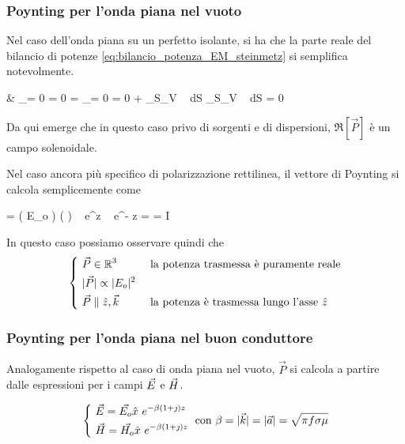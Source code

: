 	
	\subsubsection{Poynting per l'onda piana nel vuoto}
	
		Nel caso dell'onda piana su un perfetto isolante, si ha che la parte reale del bilancio di potenze \ref{eq:bilancio_potenza_EM_steinmetz} si semplifica notevolmente.
		
		\begin{esp} \label{eq:bilancio_potenza_EM_steinmetz}
			& _{= 0  \jt = 0}
				= _{= 0  \sigma = 0}
				+ \int_{S_V} \Re[\vec{P}] \cdot {} ~ dS 
				\implies \int_{S_V} \Re[\vec{P}] \cdot {} ~ dS = 0
		\end{esp}
		
		Da qui emerge che in questo caso privo di sorgenti e di dispersioni, $\Re[\vec{P}]$ è un campo solenoidale.
		
		Nel caso ancora più specifico di polarizzazione rettilinea, il vettore di Poynting si calcola semplicemente come
		\begin{esp}
				=  \left( E_o  \right) \times \left(   \right)
					~ e^{\jmath \beta z} ~ e^{- \jmath \beta z} 
				= \frac{|E_o|^2}{2\eta} \hat{z}
				= I \hat{z}
		\end{esp}

		In questo caso possiamo osservare quindi che
		\begin{equation}
			\begin{dcases}
				~ \vec{P} \in \mathbb{R}^3 & \text{ la potenza trasmessa è puramente reale} \\
				~ |\vec{P}| \propto |E_o|^2 \\
				~ \vec{P} \parallel \hat{z}, \vec{k} & \text{ la potenza è trasmessa lungo l'asse } \hat{z}
			\end{dcases}
		\end{equation}

	\subsubsection{Poynting per l'onda piana nel buon conduttore}
		Analogamente rispetto al caso di onda piana nel vuoto, $\vec{P}$ si calcola a partire dalle espressioni per i campi $\vec{E}$ e $\vec{H}$.
		
		\begin{equation}
			\begin{dcases}
				~ \vec{E} = \vec{E_o} \hat{x} ~ e^{-\beta(1+\jmath) z} \\
				~ \vec{H} = \vec{H_o} \hat{x} ~ e^{-\beta(1+\jmath) z} \\
			\end{dcases}
			\text{ con } \beta = |\vec{k}| = |\vec{a}| = \sqrt{\pi f \sigma \mu}
		\end{equation}
		
